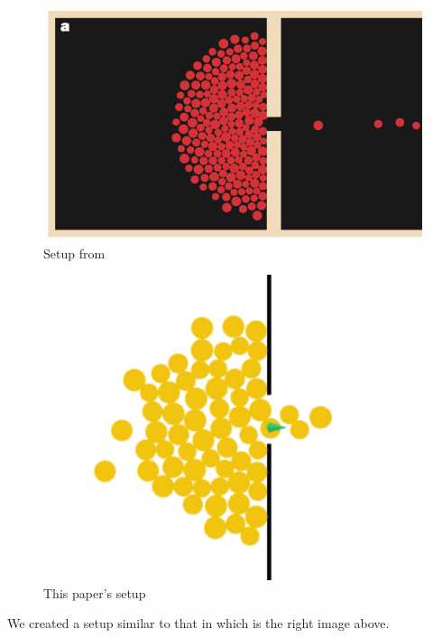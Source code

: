 \documentclass[11pt]{article}
\begin{document}
\begin{minipage}{.4\textwidth}
		\begin{figure}[H]
			\centering
			\includegraphics[width=1\linewidth]{assets/helbling-experiment-1}\\
			Setup from \cite{Helbing}
		\end{figure}
	\end{minipage}
	\begin{minipage}{.2\textwidth}	
	\vfill\hfill
	\end{minipage}
	\begin{minipage}{.4\textwidth}
		\begin{figure}[H]
			\centering
			\includegraphics[width=.75\linewidth]{assets/experiment-1}\\
			This paper's setup
		\end{figure}
	\end{minipage}
	
We created a setup similar to that in \cite{Helbing} which is the right image above.
\end{document}
